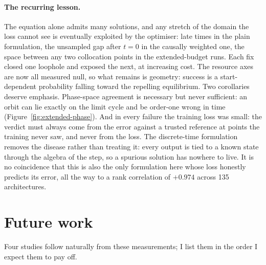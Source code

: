 \documentclass[11pt,a4paper]{article}
\begin{document}
\paragraph{The recurring lesson.}
The equation alone admits many solutions, and any stretch of the domain the
loss cannot see is eventually exploited by the optimiser: late times in the
plain formulation, the unsampled gap after $t = 0$ in the causally weighted
one, the space between any two collocation points in the extended-budget
runs. Each fix closed one loophole and exposed the next, at increasing
cost. The resource axes are now all measured null, so what remains is
geometry: success is a start-dependent probability falling toward the
repelling equilibrium. Two corollaries deserve emphasis. Phase-space
agreement is necessary but never sufficient: an orbit can lie exactly on
the limit cycle and be order-one wrong in time
(Figure~\ref{fig:extended-phase}). And in every failure the training loss
was small: the verdict must always come from the error against a trusted
reference at points the training never saw, and never from the loss. The
discrete-time formulation removes the disease rather than treating it:
every output is tied to a known state through the algebra of the step, so
a spurious solution has nowhere to live. It is no coincidence that this is
also the only formulation here whose loss honestly predicts its error, all
the way to a rank correlation of $+0.974$ across 135 architectures.

\section{Future work}
\label{sec:future}

Four studies follow naturally from these measurements; I list them in the
order I expect them to pay off.
\end{document}
